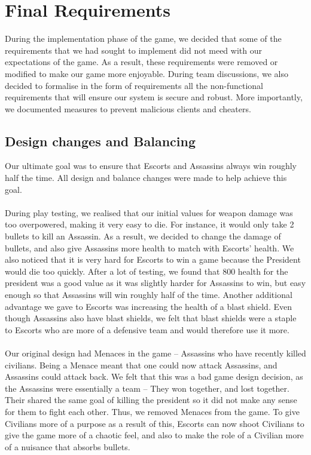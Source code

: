 \documentclass[12pt]{article}
\newcommand{\return}{\\\\\noindent}
\begin{document}
\section{Final Requirements}
During the implementation phase of the game, we decided that some of the requirements that we had sought to implement did not meed with our expectations of the game. As a result, these requirements were removed or modified to make our game more enjoyable. During team discussions, we also decided to formalise in the form of requirements all the non-functional requirements that will ensure our system is secure and robust. More importantly, we documented measures to prevent malicious clients and cheaters.
\subsection{Design changes and Balancing}
Our ultimate goal was to ensure that Escorts and Assassins always win roughly half the time. All design and balance changes were made to help achieve this goal.\return
During play testing, we realised that our initial values for weapon damage was too overpowered, making it very easy to die. For instance, it would only take 2 bullets to kill an Assassin. As a result, we decided to change the damage of bullets, and also give Assassins more health to match with Escorts' health. We also noticed that it is very hard for Escorts to win a game because the President would die too quickly. After a lot of testing, we found that 800 health for the president was a good value as it was slightly harder for Assassins to win, but easy enough so that Assassins will win roughly half of the time. Another additional advantage we gave to Escorts was increasing the health of a blast shield. Even though Assassins also have blast shields, we felt that blast shields were a staple to Escorts who are more of a defensive team and would therefore use it more.\return
Our original design had Menaces in the game -- Assassins who have recently killed civilians. Being a Menace meant that one could now attack Assassins, and Assassins could attack back. We felt that this was a bad game design decision, as the Assassins were essentially a team -- They won together, and lost together. Their shared the same goal of killing the president so it did not make any sense for them to fight each other. Thus, we removed Menaces from the game. To give Civilians more of a purpose as a result of this, Escorts can now shoot Civilians to give the game more of a chaotic feel, and also to make the role of a Civilian more of a nuisance that absorbs bullets.\return
\end{document}
